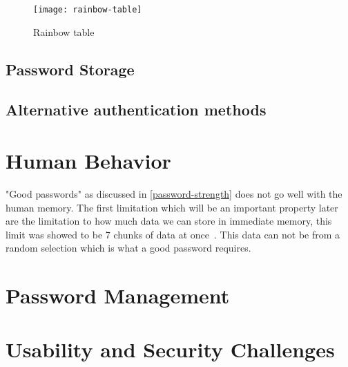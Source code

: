 \begin{figure}[h]
    \texttt{[image: rainbow-table]}
    \caption{Rainbow table}
    \label{rainbow-table}
\end{figure}

\subsection{Password Storage}

\subsection{Alternative authentication methods}

\section{Human Behavior}
"Good passwords" as discussed in \ref{password-strength} does not go well with the human memory. The first limitation which will be an important property later are the limitation to how much data we can store in immediate memory, this limit was showed to be 7 chunks of data at once~\cite{magic-seven_miller}. This data can not be from a random selection which is what a good password requires.   

\section{Password Management}

\section{Usability and Security Challenges}

